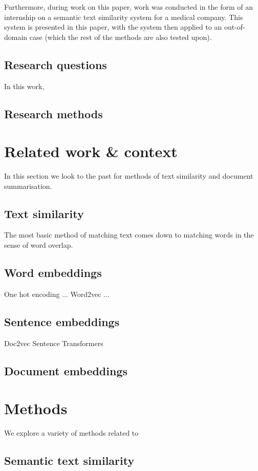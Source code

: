\documentclass[a4 paper, 12pt]{article}
\begin{document}
Furthermore, during work on this paper, work was conducted in the form of an internship on a semantic text similarity system for a medical company. This system is presented in this paper, with the system then applied to an out-of-domain case (which the rest of the methods are also tested upon). 

\subsection{Research questions}

In this work, 

\subsection{Research methods}


\section{Related work \& context}

In this section we look to the past for methods of text similarity and document summarisation. 
\subsection{Text similarity}
The most basic method of matching text comes down to matching words in the sense of word overlap. 

\subsection{Word embeddings}

One hot encoding ...
Word2vec ...

\subsection{Sentence embeddings}

Doc2vec
Sentence Transformers

\subsection{Document embeddings}

\section{Methods}
We explore a variety of methods related to 
\subsection{Semantic text similarity}
\end{document}
